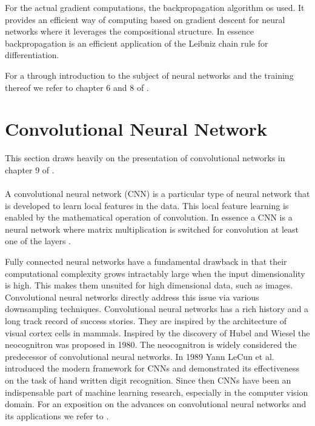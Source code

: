 \documentclass[../../thesis.tex]{subfiles}
\begin{document}
For the actual gradient computations, the backpropagation algorithm os used. It provides an efficient way of computing  based on gradient descent for neural networks where it leverages the compositional structure. In essence backpropagation is an efficient application of the Leibniz chain rule for differentiation.\newline

For a through introduction to the subject of neural networks and the training thereof we refer to chapter 6 and 8 of \cite{deeplearningbook}.


\section{Convolutional Neural Network}
This section draws heavily on the presentation of convolutional networks in chapter 9 of \cite{deeplearningbook}.\\\\

A convolutional neural network (CNN) is a particular type of neural network that is developed to learn local features in the data. This local feature learning is enabled by the mathematical operation of convolution. In essence a CNN is a neural network where matrix multiplication is switched for convolution at least one of the layers \cite{deeplearningbook}. \newline

Fully connected neural networks have a fundamental drawback in that their computational complexity grows intractably large when the input dimensionality is high. This makes them unsuited for high dimensional data, such as images. Convolutional neural networks directly address this issue via various downsampling techniques. Convolutional neural networks has a rich history and a long track record of success stories. They are inspired by the architecture of visual cortex cells in mammals. Inspired by the discovery of Hubel and Wiesel \cite{https://doi.org/10.1113/jphysiol.1968.sp008455} the neocognitron was proposed in 1980\cite{6313076}. The neocognitron is widely considered the predecessor of convolutional neural networks. In 1989 Yann LeCun et al. introduced the modern framework for CNNs \cite{LeCun1989ConvNet} and demonstrated its effectiveness on the task of hand written digit recognition. Since then CNNs have been an indispensable part of machine learning research, especially in the computer vision domain. For an exposition on the advances on convolutional neural networks and its applications we refer to \cite{gu2017recent}.
\end{document}
